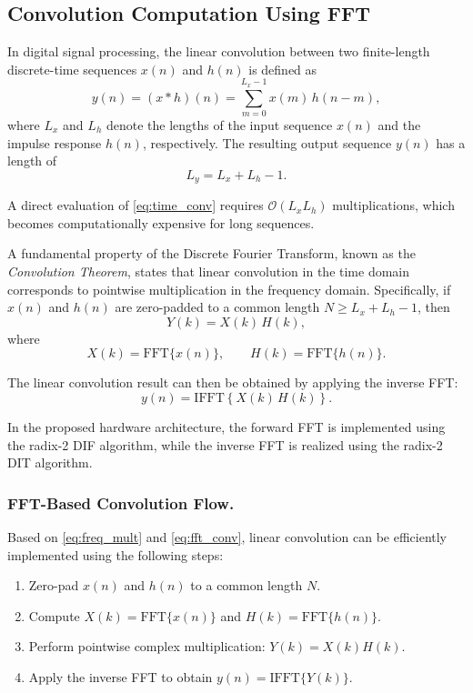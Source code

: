 \subsection{Convolution Computation Using FFT}

In digital signal processing, the linear convolution between two finite-length
discrete-time sequences $x(n)$ and $h(n)$ is defined as
\begin{equation}
y(n) = (x * h)(n) = \sum_{m=0}^{L_x-1} x(m)\,h(n-m),
\label{eq:time_conv}
\end{equation}
where $L_x$ and $L_h$ denote the lengths of the input sequence $x(n)$ and the impulse
response $h(n)$, respectively.  
The resulting output sequence $y(n)$ has a length of
\[
L_y = L_x + L_h - 1.
\]

A direct evaluation of \eqref{eq:time_conv} requires $\mathcal{O}(L_x L_h)$
multiplications, which becomes computationally expensive for long sequences.

A fundamental property of the Discrete Fourier Transform, known as the
\emph{Convolution Theorem}, states that linear convolution in the time domain
corresponds to pointwise multiplication in the frequency domain.
Specifically, if $x(n)$ and $h(n)$ are zero-padded to a common length
$N \ge L_x + L_h - 1$, then
\begin{equation}
Y(k) = X(k)\,H(k),
\label{eq:freq_mult}
\end{equation}
where
\[
X(k) = \text{FFT}\{x(n)\}, \qquad
H(k) = \text{FFT}\{h(n)\}.
\]

The linear convolution result can then be obtained by applying the inverse FFT:
\begin{equation}
y(n) = \text{IFFT}\!\left\{ X(k)\,H(k) \right\}.
\label{eq:fft_conv}
\end{equation}

In the proposed hardware architecture, the forward FFT is implemented using
the radix-2 DIF algorithm, while the inverse FFT is realized using the radix-2
DIT algorithm.

\subsubsection{FFT-Based Convolution Flow.}
Based on \eqref{eq:freq_mult} and \eqref{eq:fft_conv}, linear convolution can be
efficiently implemented using the following steps:
\begin{enumerate}
    \item Zero-pad $x(n)$ and $h(n)$ to a common length $N$.
    \item Compute $X(k) = \text{FFT}\{x(n)\}$ and $H(k) = \text{FFT}\{h(n)\}$.
    \item Perform pointwise complex multiplication: $Y(k) = X(k)H(k)$.
    \item Apply the inverse FFT to obtain $y(n) = \text{IFFT}\{Y(k)\}$.
\end{enumerate}


